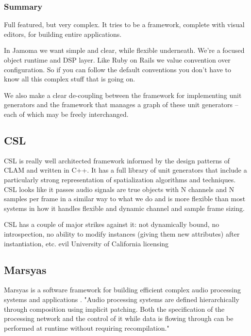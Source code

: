 \documentclass[twoside,10pt]{article}
\begin{document}
\subsubsection{Summary}

Full featured, but very complex.  It tries to be a framework, complete with visual editors, for building entire applications.

In Jamoma we want simple and clear, while flexible underneath.  We're a focused object runtime and DSP layer.  Like Ruby on Rails we value convention over configuration.  So if you can follow the default conventions you don't have to know all this complex stuff that is going on.

We also make a clear de-coupling between the framework for implementing unit generators and the framework that manages a graph of these unit generators -- each of which may be freely interchanged.


\subsection{CSL} %

CSL is really well architected framework informed by the design patterns of CLAM and written in C++.  It has a full library of unit generators that include a particularly strong representation of spatialization algorithms and techniques.  CSL looks like it passes audio signals are true objects with N channels and N samples per frame in a similar way to what we do and is more flexible than most systems in how it handles flexible and dynamic channel and sample frame sizing.

CSL has a couple of major strikes against it:   not dynamically bound, no introspection, no ability to modify instances (giving them new attributes) after instantiation, etc. evil University of California licensing


\subsection{Marsyas} %

Marsyas is a software framework for building efficient complex audio processing systems and applications \cite{Tzanetakis:2008}. "Audio processing systems are defined hierarchically through composition using implicit patching. Both the specification of the processing network and the control of it while data is flowing through can be performed at runtime without requiring recompilation."
\end{document}
